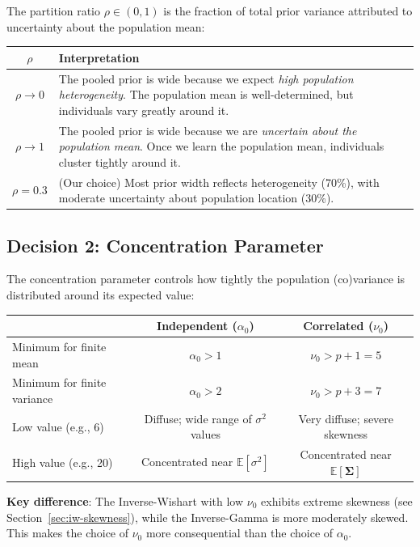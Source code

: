 \documentclass[11pt]{article}
\newcommand{\E}{\mathbb{E}}
\begin{document}
The partition ratio $\rho \in (0, 1)$ is the fraction of total prior variance attributed to uncertainty about the population mean:

\begin{center}
\begin{tabular}{cp{10cm}}
\toprule
$\rho$ & Interpretation \\
\midrule
$\rho \to 0$ & The pooled prior is wide because we expect \textit{high population heterogeneity}. The population mean is well-determined, but individuals vary greatly around it. \\
$\rho \to 1$ & The pooled prior is wide because we are \textit{uncertain about the population mean}. Once we learn the population mean, individuals cluster tightly around it. \\
$\rho = 0.3$ & (Our choice) Most prior width reflects heterogeneity (70\%), with moderate uncertainty about population location (30\%). \\
\bottomrule
\end{tabular}
\end{center}

\subsection{Decision 2: Concentration Parameter}

The concentration parameter controls how tightly the population (co)variance is distributed around its expected value:

\begin{center}
\begin{tabular}{lcc}
\toprule
& \textbf{Independent} ($\alpha_0$) & \textbf{Correlated} ($\nu_0$) \\
\midrule
Minimum for finite mean & $\alpha_0 > 1$ & $\nu_0 > p + 1 = 5$ \\
Minimum for finite variance & $\alpha_0 > 2$ & $\nu_0 > p + 3 = 7$ \\
\midrule
Low value (e.g., 6) & Diffuse; wide range of $\sigma^2$ values & Very diffuse; severe skewness \\
High value (e.g., 20) & Concentrated near $\E[\sigma^2]$ & Concentrated near $\E[\boldsymbol{\Sigma}]$ \\
\bottomrule
\end{tabular}
\end{center}

\textbf{Key difference}: The Inverse-Wishart with low $\nu_0$ exhibits extreme skewness (see Section~\ref{sec:iw-skewness}), while the Inverse-Gamma is more moderately skewed. This makes the choice of $\nu_0$ more consequential than the choice of $\alpha_0$.
\end{document}
